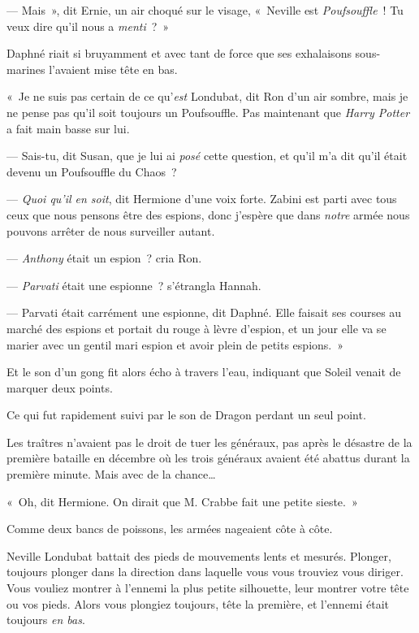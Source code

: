 --- Mais~», dit Ernie, un air choqué sur le visage, «~Neville est \emph{Poufsouffle}~!
Tu veux dire qu'il nous a \emph{menti}~?~»

Daphné riait si bruyamment et avec tant de force que ses exhalaisons sous-marines l'avaient mise tête en bas.

«~Je ne suis pas certain de ce qu'\emph{est} Londubat, dit Ron d'un air sombre, mais je ne pense pas qu'il soit toujours un Poufsouffle.
Pas maintenant que \emph{Harry Potter} a fait main basse sur lui.

--- Sais-tu, dit Susan, que je lui ai \emph{posé} cette question, et qu'il m'a dit qu'il était devenu un Poufsouffle du Chaos~?

--- \emph{Quoi qu'il en soit}, dit Hermione d'une voix forte.
Zabini est parti avec tous ceux que nous pensons être des espions, donc j'espère que dans \emph{notre} armée nous pouvons arrêter de nous surveiller autant.

--- \emph{Anthony} était un espion~? cria Ron.

--- \emph{Parvati} était une espionne~? s'étrangla Hannah.

--- Parvati était carrément une espionne, dit Daphné.
Elle faisait ses courses au marché des espions et portait du rouge à lèvre d'espion, et un jour elle va se marier avec un gentil mari espion et avoir plein de petits espions.~»

Et le son d'un gong fit alors écho à travers l'eau, indiquant que Soleil venait de marquer deux points.

Ce qui fut rapidement suivi par le son de Dragon perdant un seul point.

Les traîtres n'avaient pas le droit de tuer les généraux, pas après le désastre de la première bataille en décembre où les trois généraux avaient été abattus durant la première minute.
Mais avec de la chance…

«~Oh, dit Hermione.
On dirait que M. Crabbe fait une petite sieste.~»

\later

Comme deux bancs de poissons, les armées nageaient côte à côte.

Neville Londubat battait des pieds de mouvements lents et mesurés.
Plonger, toujours plonger dans la direction dans laquelle vous vous trouviez vous diriger.
Vous vouliez montrer à l'ennemi la plus petite silhouette, leur montrer votre tête ou vos pieds.
Alors vous plongiez toujours, tête la première, et l'ennemi était toujours \emph{en bas}.

